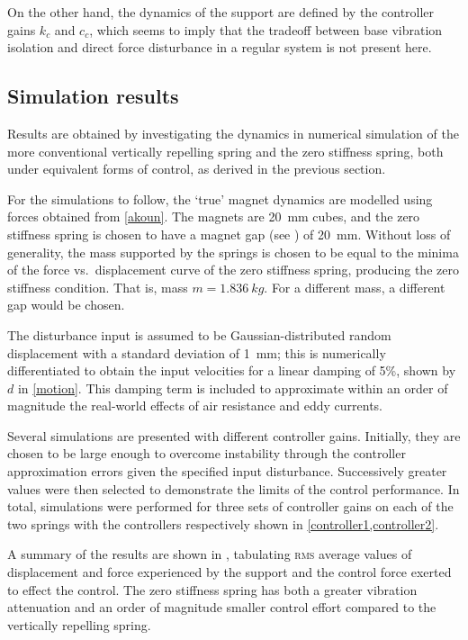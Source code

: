 On the other hand, the dynamics of the support are defined by the
controller gains $k_c$ and $c_c$, which seems to imply that the
tradeoff between base vibration isolation and direct force
disturbance in a regular system is not present here.

\subsection{Simulation results}

Results are obtained by investigating the dynamics in numerical
simulation of the more conventional vertically repelling spring and
the zero stiffness spring, both under equivalent forms of control,
as derived in the previous section.

For the simulations to follow, the `true' magnet dynamics are
modelled using forces obtained from \eqref{akoun}. The magnets are
\SI{20}{mm} cubes, and the zero stiffness spring is chosen to have a
magnet gap (see ) of \SI{20}{mm}. Without loss of
generality, the mass supported by the springs is chosen to be equal
to the minima of the force vs.\ displacement curve of the zero
stiffness spring, producing the zero stiffness condition. That is,
mass $m=\SI{1.836}{kg}$. For a different mass, a different gap
would be chosen.

The disturbance input is assumed to be Gaussian-distributed random
displacement with a standard deviation of \SI{1}{mm}; this is
numerically differentiated to obtain the input velocities for a
linear damping of 5\%, shown by $d$ in \eqref{motion}. This damping
term is included to approximate within an order of magnitude the
real-world effects of air resistance and eddy currents.

Several simulations are presented with different controller gains.
Initially, they are chosen to be large enough to overcome
instability through the controller approximation errors given the
specified input disturbance. Successively greater values were then
selected to demonstrate the limits of the control performance. In
total, simulations were performed for three sets of controller gains
on each of the two springs with the controllers respectively shown
in \eqref{controller1,controller2}.

A summary of the results are shown in , tabulating
\textsc{rms} average values of displacement and force experienced by
the support and the control force exerted to effect the control. The
zero stiffness spring has both a greater vibration attenuation and
an order of magnitude smaller control effort compared to the
vertically repelling spring.

